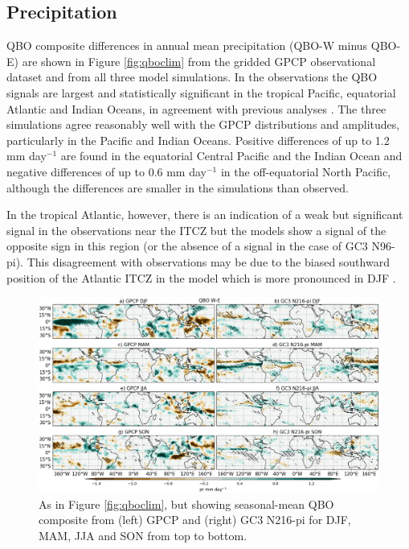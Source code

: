 \subsection{Precipitation} \label{qbo7_pr}

QBO composite differences in annual mean precipitation (QBO-W minus QBO-E) are shown in Figure \ref{fig:qboclim} from the gridded GPCP observational dataset and from all three model simulations. In the observations the QBO signals are largest and statistically significant in the tropical Pacific, equatorial Atlantic and Indian Oceans, in  agreement with previous analyses \citep{liess2012,gray2018}. The three simulations agree reasonably well with the GPCP distributions and amplitudes, particularly in the Pacific and Indian Oceans. Positive differences of up to 1.2 mm day$^{-1}$ are found in the equatorial Central Pacific and the Indian Ocean and negative differences of up to 0.6 mm day$^{-1}$ in the off-equatorial North Pacific, although the differences are smaller in the simulations than observed. 

In the tropical Atlantic, however, there is an indication of a weak but significant signal in the observations near the ITCZ but the models show a signal of the opposite sign in this region (or the absence of a signal in the case of GC3 N96-pi). This disagreement with observations may be due to the biased southward position of the Atlantic ITCZ in the model which is more pronounced in DJF \citep{garciafranco2020}.

\begin{figure}[t!]
\centering
 \includegraphics[width=\linewidth]{figures/paperprqbowqboe.png}
\caption[Seasonal mean precipitation composite difference QBO W-E ]{ As in Figure \ref{fig:qboclim}, but showing seasonal-mean QBO composite  from (left) GPCP and (right) GC3 N216-pi for DJF, MAM, JJA and SON from top to bottom. }
\label{fig:qbodjf}
\end{figure}

